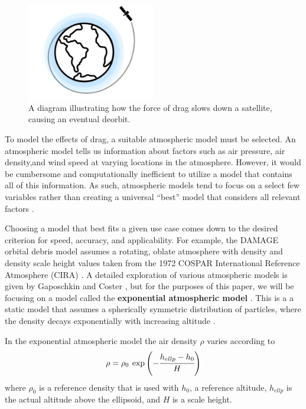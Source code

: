 \documentclass[a4paper, 12pt]{article}
\newcommand{\lindex}[1]{%
	\lowercase{\def\temp{#1}}%
	\expandafter\index\expandafter{\temp}%
}
\newcommand{\boldindex}[1]{%
	\textbf{#1}\lindex{#1}%
}
\begin{document}
\begin{figure}[h!]
	\centering
	\includegraphics[width=0.5\textwidth]{drag}
	\caption{A diagram illustrating how the force of drag slows down a satellite, causing an eventual deorbit.}
	\label{fig:drag_diagram}
\end{figure}

To model the effects of drag, a suitable atmospheric model must be selected. An atmospheric model tells us information about factors such as air pressure, air density,and wind speed at varying locations in the atmosphere. However, it would be cumbersome and computationally inefficient to utilize a model that contains all of this information.  As such, atmospheric models tend to focus on a select few variables rather than creating a universal ``best'' model that considers all relevant factors \citep{vallado_d._2013}.

Choosing a model that best fits a given use case comes down to the desired criterion for speed, accuracy, and applicability. For example, the DAMAGE orbital debris model assumes a rotating, oblate atmosphere with density and density scale height values taken from the 1972 COSPAR International Reference Atmosphere (CIRA) \citep{soton388786}.  A detailed exploration of various atmospheric models is given by Gaposchkin and Coster \citep{Gaposchkin1988AnalysisOS}, but for the purposes of this paper, we will be focusing on a model called the \boldindex{exponential atmospheric model}. This is a  a static model that assumes a spherically symmetric distribution of particles, where the density decays exponentially with increasing altitude \citep{vallado_d._2013}.

In the exponential atmospheric model the air density $\rho$ varies according to
\begin{equation}
	\rho = \rho_0\:\exp\left(-\cfrac{h_{ellp} - h_0}{H}\right)
\end{equation}
where $\rho_0$ is a reference density that is used with $h_0$,  a reference altitude,  $h_{ellp}$ is the actual altitude above the ellipsoid, and $H$ is a scale height.
\end{document}
